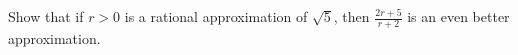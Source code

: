 Show that if $r > 0$ is a rational approximation of $\sqrt{5}$, then $\frac{2r+5}{r+2}$ is an even better approximation.
